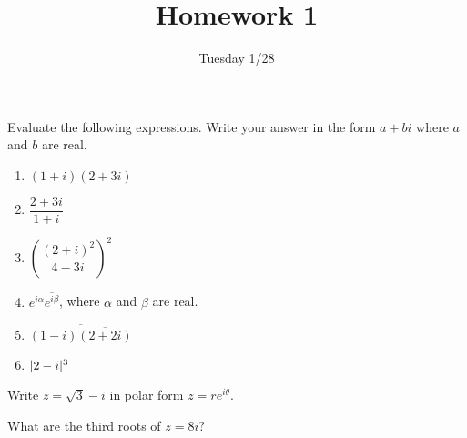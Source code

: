 \documentclass{../math135}
\title{Homework 1}
\author{}
\date{Tuesday 1/28}
\begin{document}
\begin{exercise}
	Evaluate the following expressions.  Write your answer in the form
  \(a + bi\) where \(a\) and \(b\) are real.
	\begin{enumerate}
  \item \((1+i)(2+3i)\)

    \begin{solution}
    \end{solution}

  \item \(\dfrac{2+3i}{1+i}\)

    \begin{solution}
    \end{solution}

  \item \(\left(\dfrac{(2+i)^2}{4-3i}\right)^2\)

    \begin{solution}
    \end{solution}

  \item \(e^{i\alpha} \overline{e^{i\beta}}\), where \(\alpha\) and
    \(\beta\) are real.

    \begin{solution}
    \end{solution}

  \item \(\overline{(1-i)\overline{(2+2i)}}\)

    \begin{solution}
    \end{solution}

  \item \(\lvert2-i\rvert^3\)

    \begin{solution}
    \end{solution}

	\end{enumerate}
\end{exercise}

\begin{exercise}
	Write \(z = \sqrt{3}-i\) in polar form \(z = re^{i\theta}\).

  \begin{solution}
  \end{solution}

\end{exercise}

\begin{exercise}
	What are the third roots of \(z=8i?\)

  \begin{solution}
  \end{solution}

\end{exercise}
\end{document}
